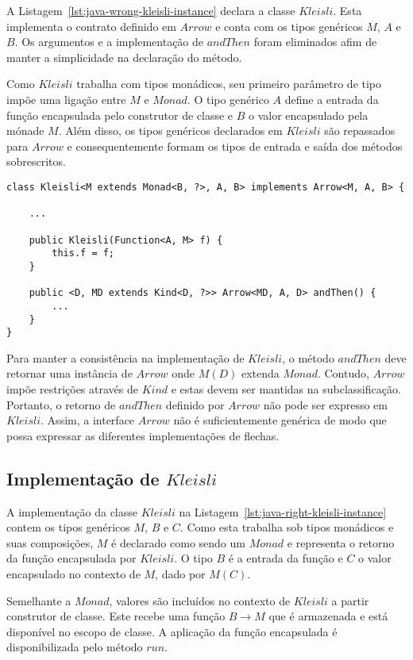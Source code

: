 \documentclass[10pt, conference]{IEEEtran}
\begin{document}
A Listagem~\ref{lst:java-wrong-kleisli-instance} declara a classe $Kleisli$. Esta implementa o contrato definido em $Arrow$ e conta com os tipos genéricos $M$, $A$ e $B$. Os argumentos e a implementação de $andThen$ foram eliminados afim de manter a simplicidade na declaração do método.


Como $Kleisli$ trabalha com tipos monádicos, seu primeiro parâmetro de tipo impõe uma ligação entre $M$ e $Monad$. O tipo genérico $A$ define a entrada da função encapsulada pelo construtor de classe e $B$ o valor encapsulado pela mónade $M$. Além disso, os tipos genéricos declarados em $Kleisli$ são repassados para $Arrow$ e consequentemente formam os tipos de entrada e saída dos métodos sobrescritos.

\begin{lstlisting}[caption = {Implementação concreta da interface $Arrow$}, label = {lst:java-wrong-kleisli-instance}]
class Kleisli<M extends Monad<B, ?>, A, B> implements Arrow<M, A, B> {

	...

	public Kleisli(Function<A, M> f) {
        this.f = f;
	}

	public <D, MD extends Kind<D, ?>> Arrow<MD, A, D> andThen() {
		...
	}
}
\end{lstlisting}

Para manter a consistência na implementação de $Kleisli$, o método $andThen$ deve retornar uma instância de $Arrow$ onde $M(D)$ extenda $Monad$. Contudo, $Arrow$ impõe restrições através de $Kind$ e estas devem ser mantidas na subclassificação. Portanto, o retorno de $andThen$ definido por $Arrow$ não pode ser expresso em $Kleisli$. Assim, a interface $Arrow$ não é suficientemente genérica de modo que possa expressar as diferentes implementações de flechas.

\subsection{Implementação de $Kleisli$}

A implementação da classe $Kleisli$ na Listagem~\ref{lst:java-right-kleisli-instance} contem os tipos genéricos $M$, $B$ e $C$. Como esta trabalha sob tipos monádicos e suas composições, $M$ é declarado como sendo um $Monad$ e representa o retorno da função encapsulada por $Kleisli$. O tipo $B$ é a entrada da função e $C$ o valor encapsulado no contexto de $M$, dado por $M(C)$.

Semelhante a $Monad$, valores são incluídos no contexto de $Kleisli$ a partir construtor de classe. Este recebe uma função $B \rightarrow M$ que é armazenada e está disponível no escopo de classe. A aplicação da função encapsulada é disponibilizada pelo método $run$.
\end{document}
